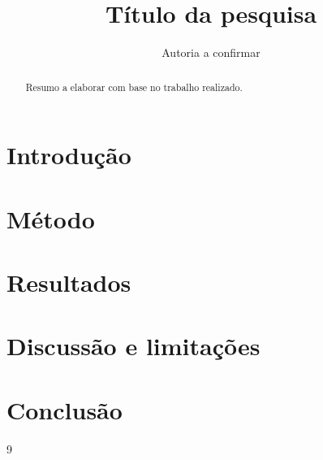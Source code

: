 \documentclass[11pt,a4paper]{article}
\title{Título da pesquisa}
\author{Autoria a confirmar}
\date{}
\begin{document}
\maketitle
\begin{abstract}
Resumo a elaborar com base no trabalho realizado.
\end{abstract}
\section{Introdução}
\section{Método}
\section{Resultados}
\section{Discussão e limitações}
\section{Conclusão}
\begin{thebibliography}{9}
\end{thebibliography}
\end{document}
